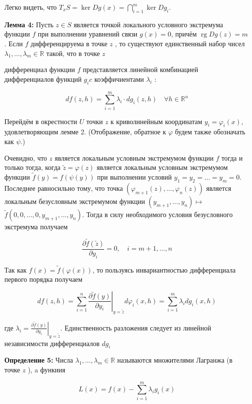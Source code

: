 \documentclass[a4paper,12pt]{article} %
\begin{document}
Легко видеть, что $T_{x} S=\operatorname{ker} D g(x)=\bigcap_{i=1}^{m} \operatorname{ker} D g_{i}$.

\textbf{Лемма 4:} Пусть $z \in S$ является точкой локального условного экстремума функции $f$ при выполнении уравнений связи $g(x)=0$, причём $\operatorname{rg} D g(z)=m$. Если $f$ дифференцируема в точке $z$ , то существуют единственный набор чисел $\lambda_{1}, \ldots, \lambda_{m} \in \mathbb{R}$ такой, что в точке $z$

дифференциал функции $f$ представляется линейной комбинацией дифференциалов функций $g_{i} c$ коэффичиентами $\lambda_{i}$ :

$$
d f(z, h)=\sum_{i=1}^{m} \lambda_{i} \cdot d g_{i}(z, h) \quad \forall h \in \mathbb{R}^{n}
$$

Перейдём в окрестности $U$ точки $z$ к криволинейным координатам $y_{i}=\varphi_{i}(x)$, удовлетворяющим лемме 2. (Отображение, обратное к $\varphi$ будем также обозначать как $\psi$.)

Очевидно, что $z$ является локальным условным экстремумом функции $f$ тогда и только тогда, когда $\tilde{z}=\varphi(z)$ является локальным условным экстремумом функции $\tilde{f}(y)=f(\psi(y))$ при выполнении условий $y_{1}=y_{2}=\ldots=y_{m}=0$. Последнее равносильно тому, что точка $\left(\varphi_{m+1}(z), \ldots, \varphi_{n}(z)\right)$ является локальным безусловным экстремумом функции $\left(y_{m+1}, \ldots, y_{n}\right) \mapsto$ $\tilde{f}\left(0,0, \ldots, 0, y_{m+1}, \ldots, y_{n}\right)$. Тогда в силу необходимого условия безусловного экстремума получаем

$$
\frac{\partial \tilde{f}(\tilde{z})}{\partial y_{i}}=0, \quad i=m+1, \ldots, n
$$

Так как $f(x)=\tilde{f}(\varphi(x))$, то пользуясь инвариантностью дифференциала первого порядка получаем

$$
d f(z, h)=\left.\sum_{i=1}^{n} \frac{\partial \tilde{f}(y)}{\partial y_{i}}\right|_{y=\tilde{z}} d \varphi_{i}(x, h)=\sum_{i=1}^{m} \lambda_{i} d g_{i}(x, h)
$$

где $\lambda_{i}=\left.\frac{\partial \tilde{f}(y)}{\partial y_{i}}\right|_{y=\tilde{z}}$. Единственность разложения следует из линейной независимости дифференциалов $d g_{i}$

\textbf{Определение 5:} Числа $\lambda_{1}, \ldots, \lambda_{m} \in \mathbb{R}$ называются множителями Лагранжа (в точке $z$ ), a функиия

$$
L(x)=f(x)-\sum_{i=1}^{m} \lambda_{i} g_{i}(x)
$$
\end{document}
